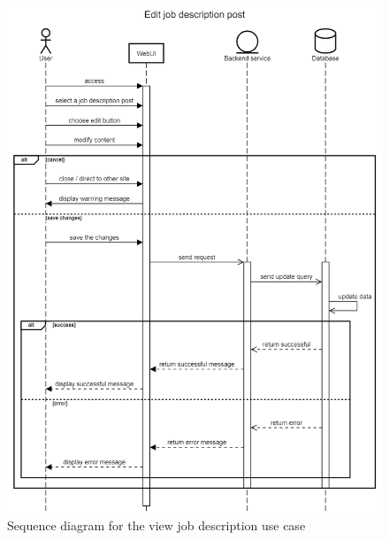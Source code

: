 \documentclass[a4paper]{article}
\begin{document}
    \begin{figure}[H]
        \centering
        \includegraphics[width=1.0\textwidth]{Edit job description post.png}
        \caption{Sequence diagram for the view job description use case}
        \label{fig:fig15}
    \end{figure}
\end{document}
